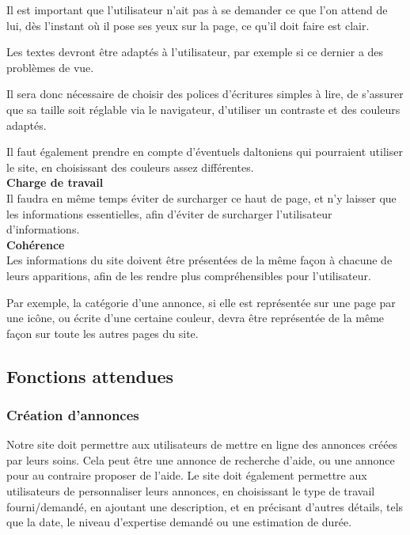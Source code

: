 \documentclass[a4paper,11pt]{article}
\begin{document}
Il est important que l'utilisateur n'ait pas à se demander ce que l'on attend de lui, dès l'instant où il pose ses yeux sur la page, ce qu'il doit faire est clair.

Les textes devront être adaptés à l’utilisateur, par exemple si ce dernier a des problèmes de vue.

Il sera donc nécessaire de choisir des polices d’écritures simples à lire, de s’assurer que sa taille soit
réglable via le navigateur, d’utiliser un contraste et des couleurs adaptés.

Il faut également prendre en compte d’éventuels daltoniens qui pourraient utiliser le site, en
choisissant des couleurs assez différentes.\\

\textbf{Charge de travail}\\

Il faudra en même temps éviter de surcharger ce haut de page, et n'y laisser que les informations essentielles, afin d'éviter de surcharger l'utilisateur d'informations.\\

\textbf{Cohérence}\\

Les informations du site doivent être présentées de la même façon à chacune de leurs apparitions, afin de les rendre plus compréhensibles pour l'utilisateur.

Par exemple, la catégorie d'une annonce, si elle est représentée sur une page par une icône, ou écrite d'une certaine couleur, devra être représentée de la même façon sur toute les autres pages du site.



\subsection{Fonctions attendues}

\subsubsection{Création d’annonces}

Notre site doit permettre aux utilisateurs de mettre en ligne des annonces créées par leurs soins. Cela
peut être une annonce de recherche d’aide, ou une annonce pour au contraire proposer de l’aide. Le
site doit également permettre aux utilisateurs de personnaliser leurs annonces, en choisissant le type
de travail fourni/demandé, en ajoutant une description, et en précisant d’autres détails, tels que la date, le
niveau d’expertise demandé ou une estimation de durée.\\
\end{document}
